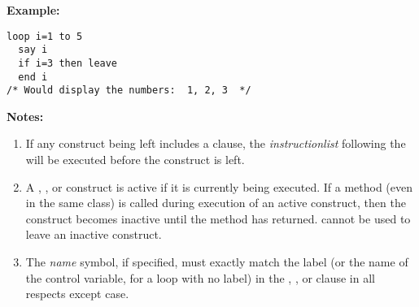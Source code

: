 \textbf{Example:}
\begin{lstlisting}
loop i=1 to 5
  say i
  if i=3 then leave
  end i
/* Would display the numbers:  1, 2, 3  */
\end{lstlisting}
 \textbf{Notes:}
\begin{enumerate}
\item If any construct being left includes a  clause, the
\emph{instructionlist} following the  will be
executed before the construct is left.
\item 
A , , or  construct
is active if it is currently being executed.
If a method (even in the same class) is called during execution of an
active construct, then the construct becomes inactive until the method
has returned.
 cannot be used to leave an inactive construct.
\item The \emph{name} symbol, if specified, must exactly match the
label (or the name of the control variable, for a loop with no label) in
the , , or  clause in all
respects except case.
\end{enumerate}
